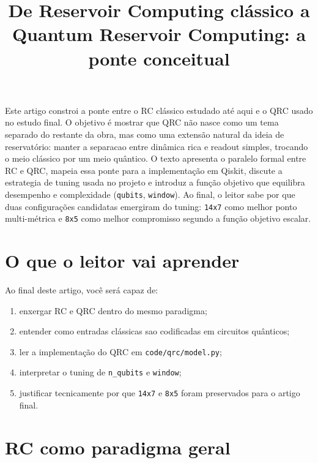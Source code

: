 \documentclass[12pt]{article}
\title{De Reservoir Computing clássico a Quantum Reservoir Computing: a ponte conceitual}
\author{}
\providecommand{\tightlist}{%
          \setlength{\itemsep}{0pt}\setlength{\parskip}{0pt}}
\begin{document}
        \maketitle

        \begin{resumo}
        Este artigo constroi a ponte entre o RC clássico estudado até aqui e o QRC usado no estudo final. O objetivo é mostrar que QRC não nasce como um tema separado do restante da obra, mas como uma extensão natural da ideia de reservatório: manter a separacao entre dinâmica rica e readout simples, trocando o meio clássico por um meio quântico. O texto apresenta o paralelo formal entre RC e QRC, mapeia essa ponte para a implementação em Qiskit, discute a estrategia de tuning usada no projeto e introduz a função objetivo que equilibra desempenho e complexidade (\texttt{qubits}, \texttt{window}). Ao final, o leitor sabe por que duas configurações candidatas emergiram do tuning: \texttt{14x7} como melhor ponto multi-métrica e \texttt{8x5} como melhor compromisso segundo a função objetivo escalar.
        \end{resumo}

        \section{O que o leitor vai aprender}\label{1-o-que-o-leitor-vai-aprender}

Ao final deste artigo, você será capaz de:

\begin{enumerate}
\def\labelenumi{\arabic{enumi}.}
\tightlist
\item
  enxergar RC e QRC dentro do mesmo paradigma;
\item
  entender como entradas clássicas sao codificadas em circuitos quânticos;
\item
  ler a implementação do QRC em \texttt{code/qrc/model.py};
\item
  interpretar o tuning de \texttt{n\_qubits} e \texttt{window};
\item
  justificar tecnicamente por que \texttt{14x7} e \texttt{8x5} foram preservados para o artigo final.
\end{enumerate}

\section{RC como paradigma geral}\label{2-rc-como-paradigma-geral}
\end{document}
